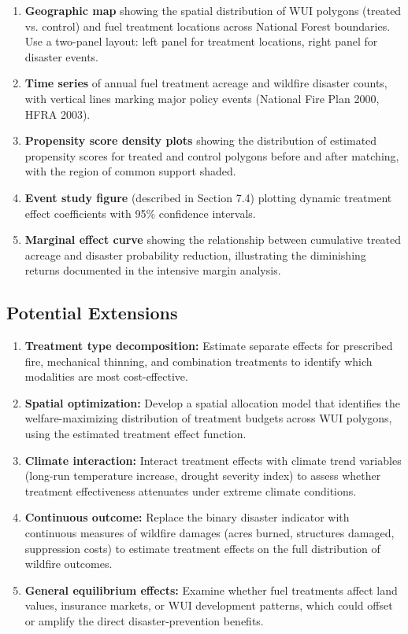 \documentclass[12pt, letterpaper]{article}
\begin{document}
\begin{enumerate}
    \item \textbf{Geographic map} showing the spatial distribution of WUI polygons (treated vs. control) and fuel treatment locations across National Forest boundaries. Use a two-panel layout: left panel for treatment locations, right panel for disaster events.

    \item \textbf{Time series} of annual fuel treatment acreage and wildfire disaster counts, with vertical lines marking major policy events (National Fire Plan 2000, HFRA 2003).

    \item \textbf{Propensity score density plots} showing the distribution of estimated propensity scores for treated and control polygons before and after matching, with the region of common support shaded.

    \item \textbf{Event study figure} (described in Section 7.4) plotting dynamic treatment effect coefficients with 95\% confidence intervals.

    \item \textbf{Marginal effect curve} showing the relationship between cumulative treated acreage and disaster probability reduction, illustrating the diminishing returns documented in the intensive margin analysis.
\end{enumerate}

\subsection{Potential Extensions}

\begin{enumerate}
    \item \textbf{Treatment type decomposition:} Estimate separate effects for prescribed fire, mechanical thinning, and combination treatments to identify which modalities are most cost-effective.

    \item \textbf{Spatial optimization:} Develop a spatial allocation model that identifies the welfare-maximizing distribution of treatment budgets across WUI polygons, using the estimated treatment effect function.

    \item \textbf{Climate interaction:} Interact treatment effects with climate trend variables (long-run temperature increase, drought severity index) to assess whether treatment effectiveness attenuates under extreme climate conditions.

    \item \textbf{Continuous outcome:} Replace the binary disaster indicator with continuous measures of wildfire damages (acres burned, structures damaged, suppression costs) to estimate treatment effects on the full distribution of wildfire outcomes.

    \item \textbf{General equilibrium effects:} Examine whether fuel treatments affect land values, insurance markets, or WUI development patterns, which could offset or amplify the direct disaster-prevention benefits.
\end{enumerate}
\end{document}
